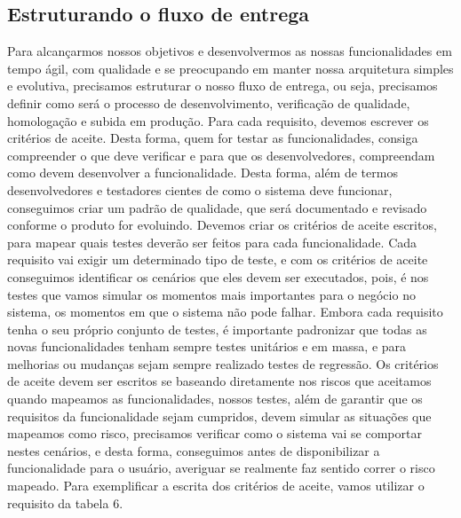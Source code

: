     \subsection{Estruturando o fluxo de entrega}
      Para alcançarmos nossos objetivos e desenvolvermos as nossas funcionalidades
      em tempo ágil, com qualidade e se preocupando em manter nossa arquitetura
      simples e evolutiva, precisamos estruturar o nosso fluxo de entrega, ou seja,
      precisamos definir como será o processo de desenvolvimento, verificação de
      qualidade, homologação e subida em produção. \newline
      Para cada requisito, devemos escrever os critérios de aceite. Desta forma,
      quem for testar as funcionalidades, consiga compreender o que deve verificar
      e para que os desenvolvedores, compreendam como devem desenvolver a
      funcionalidade. Desta forma, além de termos desenvolvedores e testadores
      cientes de como o sistema deve funcionar, conseguimos criar um padrão de
      qualidade, que será documentado e revisado conforme o produto for evoluindo.
      Devemos criar os critérios de aceite escritos, para mapear quais testes deverão
      ser feitos para cada funcionalidade. Cada requisito vai exigir um determinado
      tipo de teste, e com os critérios de aceite conseguimos identificar os cenários
      que eles devem ser executados, pois, é nos testes que vamos simular os momentos
      mais importantes para o negócio no sistema, os momentos em que o sistema não
      pode falhar. Embora cada requisito tenha o seu próprio conjunto de testes,
      é importante padronizar que todas as novas funcionalidades tenham sempre testes
      unitários e em massa, e para melhorias ou mudanças sejam sempre realizado testes
      de regressão. Os critérios de aceite devem ser escritos se baseando diretamente
      nos riscos que aceitamos quando mapeamos as funcionalidades, nossos testes,
      além de garantir que os requisitos da funcionalidade sejam cumpridos, devem
      simular as situações que mapeamos como risco, precisamos verificar como o sistema
      vai se comportar nestes cenários, e desta forma, conseguimos antes de disponibilizar
      a funcionalidade para o usuário, averiguar se realmente faz sentido correr
      o risco mapeado. Para exemplificar a escrita dos critérios de aceite, vamos
      utilizar o requisito da tabela 6. \newline

